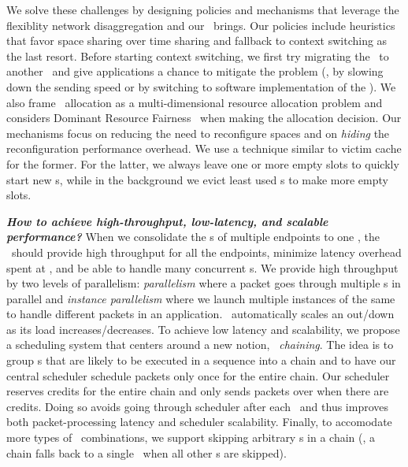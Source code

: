 We solve these challenges by designing policies and mechanisms that leverage the flexiblity network disaggregation and our \snic\ brings.
Our policies include heuristics that favor space sharing over time sharing and fallback to context switching as the last resort. Before starting context switching, we first try migrating the \nt\ to another \snic\ and give applications a chance to mitigate the problem (\eg, by slowing down the sending speed or by switching to software implementation of the \nt). We also frame \nt\ allocation as a multi-dimensional resource allocation problem and considers Dominant Resource Fairness~\cite{DRF} when making the allocation decision.
Our mechanisms focus on reducing the need to reconfigure spaces and on {\em hiding} the reconfiguration performance overhead. We use a technique similar to victim cache for the former. For the latter, we always leave one or more empty slots to quickly start new \nt{}s, while in the background we evict least used \nt{}s to make more empty slots.

\vspace{0.05in}
\noindent \textbf{\textit{How to achieve high-throughput, low-latency, and scalable performance?}}
When we consolidate the \nt{}s of multiple endpoints to one \snic, the \snic\ should provide high throughput for all the endpoints, minimize latency overhead spent at \snic, and be able to handle many concurrent \nt{}s.
We provide high throughput by two levels of parallelism:
{\em \nt{} parallelism} where a packet goes through multiple \nt{}s in parallel and {\em instance parallelism} where we launch multiple instances of the same \nt{} to handle different packets in an application.
\snic\ automatically scales an \nt{} out/down as its load increases/decreases. 
To achieve low latency and scalability, we propose a scheduling system that centers around a new notion, {\em \nt\ chaining}.
The idea is to group \nt{}s that are likely to be executed in a sequence into a chain and to have our central scheduler schedule packets only once for the entire chain. 
Our scheduler reserves credits for the entire chain and only sends packets over when there are credits.
Doing so avoids going through scheduler after each \nt\ and thus improves both packet-processing latency and scheduler scalability.
Finally, to accomodate more types of \nt\ combinations, we support skipping arbitrary \nt{}s in a chain (\eg, a chain falls back to a single \nt\ when all other \nt{}s are skipped).


